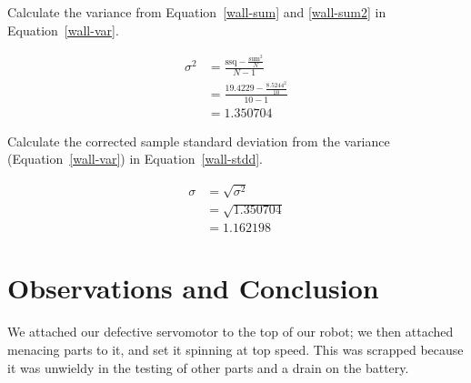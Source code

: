 \documentclass[twocolumn]{article}
\begin{document}
Calculate the variance from Equation~\ref{wall-sum} and \ref{wall-sum2} in Equation~\ref{wall-var}.

\begin{align}
\sigma^{2} &= \frac{\text{ssq} - \frac{\text{sum}^{2}}{N}}{N-1} \nonumber\\
 &= \frac{19.4229 - \frac{8.5244^2}{10}}{10-1} \nonumber\\
 &= 1.350704 \label{wall-var}
\end{align}

Calculate the corrected sample standard deviation from the variance (Equation~\ref{wall-var}) in Equation~\ref{wall-stdd}.

\begin{align}
\sigma &= \sqrt{\sigma^{2}} \nonumber\\
 &= \sqrt{1.350704} \nonumber\\
 &= 1.162198 \label{wall-stdd}
\end{align}

\section{Observations and Conclusion}

We attached our defective servomotor to the top of our robot; we then attached menacing parts to it, and set it spinning at top speed. This was scrapped because it was unwieldy in the testing of other parts and a drain on the battery.
\end{document}
